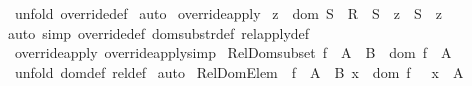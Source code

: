 \begin{isabellebody}
%
\isadelimproof
%
\endisadelimproof
%
\isatagproof
{}\isamarkupfalse%
\ {\isacharparenleft}unfold\ override{\isacharunderscore}def{\isacharparenright}\isanewline
{}\isamarkupfalse%
\ auto\isanewline
{}\isamarkupfalse%
%
\endisatagproof
{\isafoldproof}%
%
\isadelimproof
\isanewline
%
\endisadelimproof
\isanewline
{}\isamarkupfalse%
\ override{\isacharunderscore}apply{}\ {\isacharcolon}\isanewline
{\isachardoublequoteopen}z\ {\isacharcolon}\ dom\ S\ {\isacharequal}{\isacharequal}{\isachargreater}\ {\isacharparenleft}R\ {\isacharparenleft}{\isacharplus}{\isacharparenright}\ S{\isacharparenright}\ {\isacharpercent}{\isacharcircum}\ z\ {\isacharequal}\ S\ {\isacharpercent}{\isacharcircum}\ z{\isachardoublequoteclose}\isanewline
%
\isadelimproof
%
\endisadelimproof
%
\isatagproof
{}\isamarkupfalse%
{\isacharparenleft}auto\ simp{\isacharcolon}\ override{\isacharunderscore}def\ dom{\isacharunderscore}substr{\isacharunderscore}def\ rel{\isacharunderscore}apply{\isacharunderscore}def{\isacharparenright}%
\endisatagproof
{\isafoldproof}%
%
\isadelimproof
\isanewline
%
\endisadelimproof
{}\isamarkupfalse%
\ override{\isacharunderscore}apply\ override{\isacharunderscore}apply{}{\isacharbrackleft}simp{\isacharbrackright}%
\isamarkuptrue%
\isamarkupfalse%
\ Rel{\isacharunderscore}Dom{\isacharunderscore}subset{\isacharcolon}\ {\isachardoublequoteopen}f\ {\isacharcolon}\ {\isacharparenleft}A\ {\isacharless}{\isacharminus}{\isacharminus}{\isachargreater}\ B{\isacharparenright}\ {\isacharequal}{\isacharequal}{\isachargreater}\ dom\ f\ {\isacharless}{\isacharequal}\ A{\isachardoublequoteclose}\isanewline
%
\isadelimproof
%
\endisadelimproof
%
\isatagproof
{}\isamarkupfalse%
\ {\isacharparenleft}unfold\ dom{\isacharunderscore}def\ rel{\isacharunderscore}def{\isacharparenright}\isanewline
{}\isamarkupfalse%
\ auto\isanewline
{}\isamarkupfalse%
%
\endisatagproof
{\isafoldproof}%
%
\isadelimproof
\isanewline
%
\endisadelimproof
\isanewline
{}\isamarkupfalse%
\ Rel{\isacharunderscore}Dom{\isacharunderscore}Elem{\isacharcolon}\ {\isachardoublequoteopen}{\isacharbrackleft}{\isacharbar}\ f\ {\isacharcolon}\ {\isacharparenleft}A\ {\isacharless}{\isacharminus}{\isacharminus}{\isachargreater}\ B{\isacharparenright}{\isacharsemicolon}\ x\ {\isacharcolon}\ dom\ f\ {\isacharbar}{\isacharbrackright}\ {\isacharequal}{\isacharequal}{\isachargreater}\ x\ {\isacharcolon}\ A{\isachardoublequoteclose}\isanewline

\end{isabellebody}
